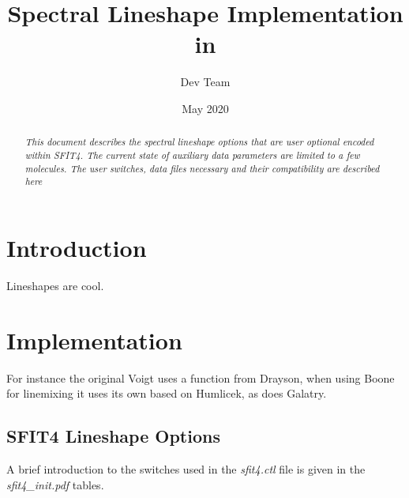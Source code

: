 \documentclass[12pt, letterpaper]{article}
\title{Spectral Lineshape Implementation in \sfi}
\author[1]{\sfi Dev Team}
\date{May 2020}
\newcommand{\sfi}{SFIT4\xspace}
\begin{document}
\begin{titlepage}

\maketitle
\thispagestyle{empty}
\pagestyle{empty}

\begin{abstract}
  \begin{adjustwidth}{2em}{2em} 
    \large{
      \emph{
\noindent This document describes the spectral lineshape options that are user optional encoded within \sfi.  The current state of auxiliary data parameters are limited to a few molecules.  The user switches, data files necessary and their compatibility are described here
}}
      
  \end{adjustwidth}

\end{abstract}

\end{titlepage}
 
\tableofcontents 

\pagebreak

\section{Introduction} 
\label{sec:intro}

Lineshapes are cool.

\section{Implementation} 
\label{sec:implement}

   For instance the original Voigt uses a function from Drayson,  when using Boone for linemixing it uses its own based on Humlicek, as does Galatry. 

\subsection{\sfi Lineshape Options}


\noindent A brief introduction to the switches used in the \textit{sfit4.ctl} file is given in the \textit{sfit4\_init.pdf} tables.
\end{document}
